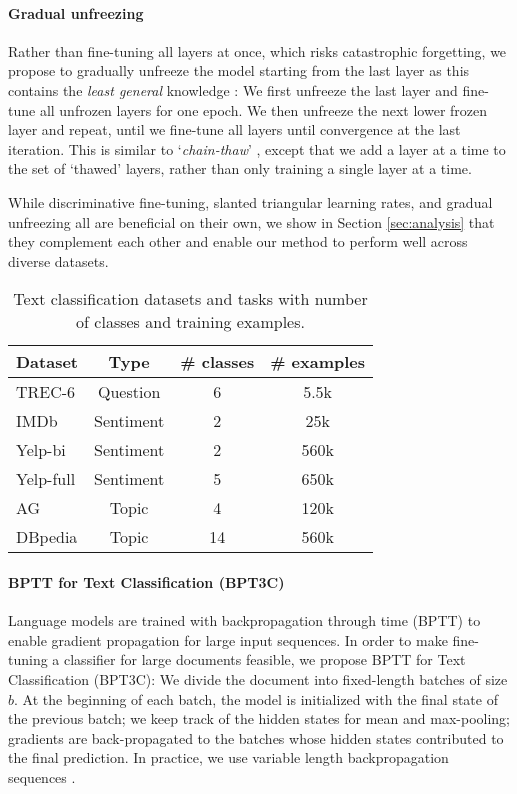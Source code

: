 \documentclass[11pt,a4paper]{article}
\begin{document}
\paragraph{Gradual unfreezing} Rather than fine-tuning all layers at once, which risks catastrophic forgetting, we propose to gradually unfreeze the model starting from the last layer as this contains the \emph{least general} knowledge \cite{yosinski2014transferable}: We first unfreeze the last layer and fine-tune all unfrozen layers for one epoch. We then unfreeze the next lower frozen layer and repeat, until we fine-tune all layers until convergence at the last iteration. This is similar to `\emph{chain-thaw}' \cite{Felbo2017}, except that we add a layer at a time to the set of `thawed' layers, rather than only training a single layer at a time. 

While discriminative fine-tuning, slanted triangular learning rates, and gradual unfreezing all are beneficial on their own, we show in Section \ref{sec:analysis} that they complement each other and enable our method to perform well across diverse datasets.

\begin{table}
  \centering
\begin{tabular}{l c c c}
    \toprule
Dataset & Type & \# classes & \# examples\\
\midrule
TREC-6  & Question & 6 & 5.5k  \\
IMDb    & Sentiment & 2 & 25k   \\
Yelp-bi & Sentiment & 2 & 560k \\
Yelp-full & Sentiment & 5 & 650k \\
AG & Topic & 4 & 120k\\
DBpedia & Topic & 14 & 560k\\
\bottomrule
  \end{tabular}
      \caption{Text classification datasets and tasks with number of classes and training examples.}
  \label{tab:tasks}
\end{table}

\paragraph{BPTT for Text Classification (BPT3C)} Language models are trained with backpropagation through time (BPTT) to enable gradient propagation for large input sequences. In order to make fine-tuning a classifier for large documents feasible, we propose BPTT for Text Classification (BPT3C): We divide the document into fixed-length batches of size $b$. At the beginning of each batch, the model is initialized with the final state of the previous batch; we keep track of the hidden states for mean and max-pooling; gradients are back-propagated to the batches whose hidden states contributed to the final prediction. In practice, we use variable length backpropagation sequences \cite{Merity2017}.
\end{document}
